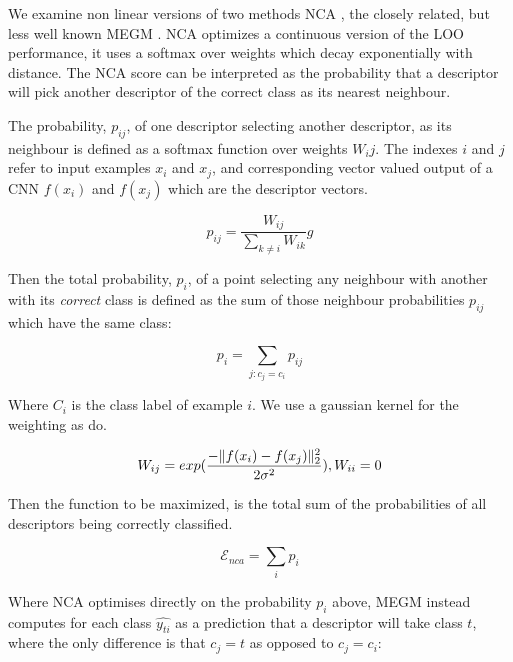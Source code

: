 We examine non linear versions of two methods \gls{NCA} \cite{Goldberger2004}, the closely related, but less well known \gls{MEGM} \cite {Zaidi2011}. \gls{NCA} optimizes a continuous version of the \gls{LOO} performance, it uses a softmax over weights which decay exponentially with distance. The \gls{NCA} score can be interpreted as the probability that a descriptor will pick another descriptor of the correct class as its nearest neighbour. 

The probability, $ p_{ij} $, of one descriptor selecting another descriptor, as its neighbour is defined as a softmax function over weights $W_ij$. The indexes $ i $ and $ j $ refer to input examples $x_i$ and $x_j$, and corresponding vector valued output of a \gls{CNN} $f(x_i)$ and $f(x_j)$ which are the descriptor vectors.

\begin{equation}
\label{eq:nca_prob_pair}
p_{ij} =  \frac {W_{ij}} {\sum_{k \neq i}{W_{ik}}}g
\end{equation}

Then the total probability, $ p_i $, of a point selecting any neighbour with another with its \emph{correct} class is defined as the sum of those neighbour probabilities $p_{ij}$ which have the same class:

\begin{equation}
\label{eq:nca_prob}
p_{i} =  \sum_{j:c_j = c_i}{p_{ij}}
\end{equation}

Where $ C_i $ is the class label of example $ i $. We use a gaussian kernel for the weighting as \cite{Zaidi2011} do. 

\begin{equation}
 \label{eq:gaussian_kernel}
W_{ij} = exp(\frac{-\lVert f(x_i) - f(x_j) \rVert^2_2 }{2\sigma^2}), \space W_{ii} = 0
\end{equation}


Then the function to be maximized, is the total sum of the probabilities of all descriptors being correctly classified.

\begin{equation}
\label{eq:nca_loss}
\mathcal{E}_{nca} =  \sum_i {p_i}
\end{equation}

Where \gls{NCA} optimises directly on the probability $ p_{i} $ above, \gls{MEGM} instead computes for each class $ \hat{y_{ti}} $ as a prediction that a descriptor will take class $ t $, where the only difference is that $ c_j = t $ as opposed to $ c_j = c_i $:

